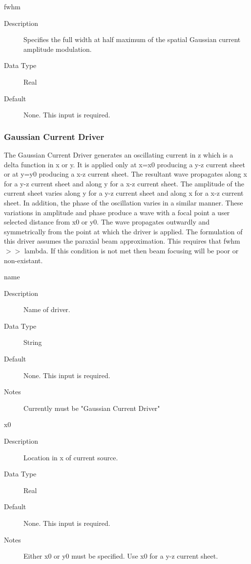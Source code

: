 \documentclass[11pt]{amsart}
\begin{document}
fwhm
\begin{description}
\item [Description] Specifies the full width at half maximum of the spatial
Gaussian current amplitude modulation.
\item [Data Type] Real
\item [Default] None.  This input is required.
\end{description}

\subsubsection*{Gaussian Current Driver}
The Gaussian Current Driver generates an oscillating current in z which is a
delta function in x or y.  It is applied only at x=x0 producing a y-z current
sheet or at y=y0 producing a x-z current sheet.  The resultant wave propagates
along x for a y-z current sheet and along y for a x-z current sheet.  The
amplitude of the current sheet varies along y for a y-z current sheet and along
x for a x-z current sheet.  In addition, the phase of the oscillation varies in
a similar manner.  These variations in amplitude and phase produce a wave with
a focal point a user selected distance from x0 or y0.  The wave propagates
outwardly and symmetrically from the point at which the driver is applied.  The
formulation of this driver assumes the paraxial beam approximation.  This
requires that fwhm $>>$ lambda.  If this condition is not met then beam focusing
will be poor or non-existant.

name
\begin{description}
\item [Description] Name of driver.
\item [Data Type] String
\item [Default] None.  This input is required.
\item [Notes] Currently must be "Gaussian Current Driver"
\end{description}

x0
\begin{description}
\item [Description] Location in x of current source.
\item [Data Type] Real
\item [Default] None.  This input is required.
\item [Notes] Either x0 or y0 must be specified.  Use x0 for a y-z current
sheet.
\end{description}
\end{document}
